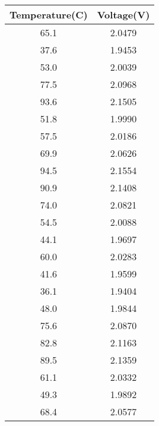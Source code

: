 \begin{tabular}{|c|c|}
\hline
\textbf{Temperature(C)} & \textbf{Voltage(V)} \\
\hline
65.1 & 2.0479\\
\hline
37.6 & 1.9453 \\
\hline
53.0 & 2.0039 \\
\hline
77.5 & 2.0968\\
\hline
93.6 & 2.1505 \\
\hline
51.8 & 1.9990 \\
\hline
57.5 & 2.0186\\
\hline
69.9 & 2.0626 \\
\hline
94.5 & 2.1554 \\
\hline
90.9 & 2.1408\\
\hline
74.0 & 2.0821 \\
\hline
54.5 & 2.0088 \\
\hline
44.1 & 1.9697 \\
\hline
60.0 & 2.0283\\
\hline
41.6 & 1.9599 \\
\hline
36.1 & 1.9404 \\
\hline
48.0 & 1.9844\\
\hline
75.6 & 2.0870 \\
\hline
82.8 & 2.1163 \\
\hline
89.5 & 2.1359 \\
\hline
61.1 & 2.0332 \\
\hline
49.3 & 1.9892\\
\hline
68.4 & 2.0577 \\
\hline
\end{tabular}